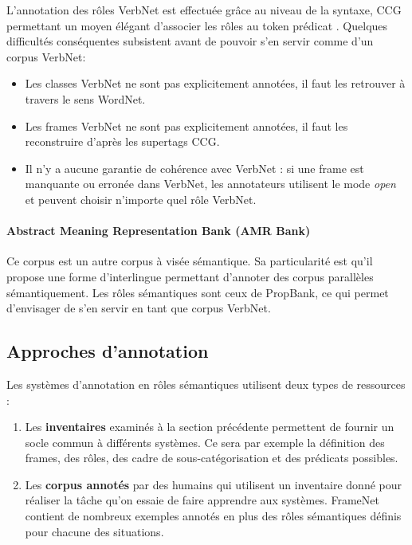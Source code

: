 L'annotation des rôles VerbNet est effectuée grâce au niveau de la syntaxe, CCG
permettant un moyen élégant d'associer les rôles au token prédicat
\citep{bos2012annotating}. Quelques difficultés conséquentes subsistent avant
de pouvoir s'en servir comme d'un corpus VerbNet:

\begin{itemize}
    \item Les classes VerbNet ne sont pas explicitement annotées, il faut les
        retrouver à travers le sens WordNet.
    \item Les frames VerbNet ne sont pas explicitement annotées, il faut les
        reconstruire d'après les supertags CCG.
    \item Il n'y a aucune garantie de cohérence avec VerbNet : si une frame est
        manquante ou erronée dans VerbNet, les annotateurs utilisent le mode
        \emph{open} et peuvent choisir n'importe quel rôle VerbNet.
\end{itemize}

\paragraph{Abstract Meaning Representation Bank (AMR Bank)}

Ce corpus \citep{banarescu2013abstract} est un autre corpus à visée sémantique.
Sa particularité est qu'il propose une forme d'interlingue permettant d'annoter
des corpus parallèles sémantiquement. Les rôles sémantiques sont ceux de
PropBank, ce qui permet d'envisager de s'en servir en tant que corpus VerbNet.

\subsection{Approches d'annotation}

Les systèmes d'annotation en rôles sémantiques utilisent deux types de
ressources :

\begin{enumerate}
    \item Les \textbf{inventaires} examinés à la section précédente permettent
        de fournir un socle commun à différents systèmes. Ce sera par exemple
        la définition des frames, des rôles, des cadre de sous-catégorisation
        et des prédicats possibles.
    \item Les \textbf{corpus annotés} par des humains qui utilisent un
        inventaire donné pour réaliser la tâche qu'on essaie de faire apprendre
        aux systèmes. FrameNet contient de nombreux exemples annotés en plus
        des rôles sémantiques définis pour chacune des situations.
\end{enumerate}

